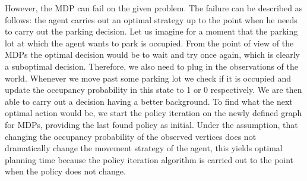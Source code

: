     However, the MDP can fail on the given problem. The failure can be described as follows: the agent carries out an optimal strategy up to the point when he needs to carry out the parking decision. Let us imagine for a moment that the parking lot at which the agent wants to park is occupied. From the point of view of the MDPs the optimal decision would be to wait and try once again, which is clearly a suboptimal decision. Therefore, we also need to plug in the observations of the world. Whenever we move past some parking lot we check if it is occupied and update the occupancy probability in this state to 1 or 0 respectively. We are then able to carry out a decision having a better background. To find what the next optimal action would be, we start the policy iteration on the newly defined graph for MDPs, providing the last found policy as initial. Under the assumption, that changing the occupancy probability of the observed vertices does not dramatically change the movement strategy of the agent, this yields optimal planning time because the policy iteration algorithm is carried out to the point when the policy does not change.

